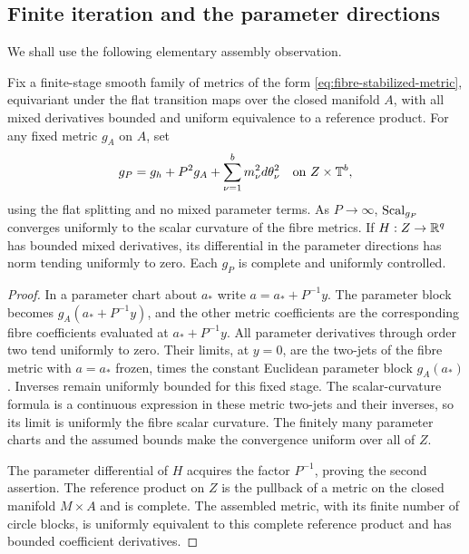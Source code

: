 \subsection{Finite iteration and the parameter directions}

We shall use the following elementary assembly observation.

\begin{lemma}\label{lem:parameter-scaling}
Fix a finite-stage smooth family of metrics of the form
\eqref{eq:fibre-stabilized-metric}, equivariant under the flat transition maps over the closed manifold $A$, with all mixed derivatives bounded and uniform equivalence to a reference product. For any fixed metric $g_A$ on $A$, set
\[
 g_P=g_h+P^2g_A+\sum_{\nu=1}^b m_\nu^2d\theta_\nu^2
 \quad\text{on }Z\times\mathbb T^b,
\]
using the flat splitting and no mixed parameter terms. As $P\to\infty$, $\operatorname{Scal}_{g_P}$ converges uniformly to the scalar curvature of the fibre metrics. If $H:Z\to\mathbb R^q$ has bounded mixed derivatives, its differential in the parameter directions has norm tending uniformly to zero. Each $g_P$ is complete and uniformly controlled.
\end{lemma}

\begin{proof}
In a parameter chart about $a_*$ write $a=a_*+P^{-1}y$. The parameter block becomes $g_A(a_*+P^{-1}y)$, and the other metric coefficients are the corresponding fibre coefficients evaluated at $a_*+P^{-1}y$. All parameter derivatives through order two tend uniformly to zero. Their limits, at $y=0$, are the two-jets of the fibre metric with $a=a_*$ frozen, times the constant Euclidean parameter block $g_A(a_*)$. Inverses remain uniformly bounded for this fixed stage. The scalar-curvature formula is a continuous expression in these metric two-jets and their inverses, so its limit is uniformly the fibre scalar curvature. The finitely many parameter charts and the assumed bounds make the convergence uniform over all of $Z$.

The parameter differential of $H$ acquires the factor $P^{-1}$, proving the second assertion. The reference product on $Z$ is the pullback of a metric on the closed manifold $M\times A$ and is complete. The assembled metric, with its finite number of circle blocks, is uniformly equivalent to this complete reference product and has bounded coefficient derivatives.
\end{proof}

